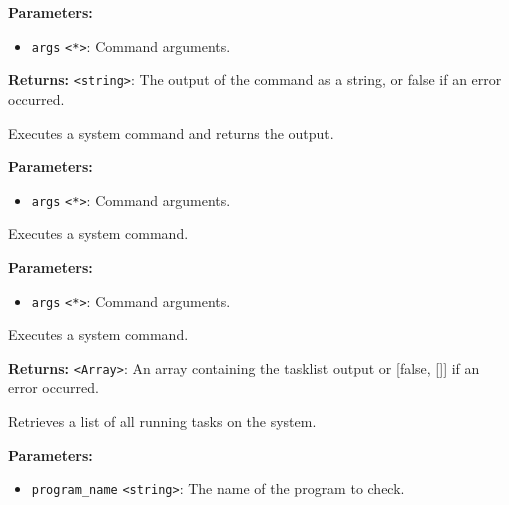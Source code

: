 \documentclass[12pt,a4paper]{article}
\begin{document}
\noindent \textbf{Parameters:}
\begin{itemize}
  \item \texttt{args} \texttt{<*>}: Command arguments.
\end{itemize}

\noindent \textbf{Returns:} \texttt{<string>}: The output of the command as a string, or false if an error occurred.

\noindent Executes a system command and returns the output.

\vspace{5mm}
\noindent {}


\noindent \textbf{Parameters:}
\begin{itemize}
  \item \texttt{args} \texttt{<*>}: Command arguments.
\end{itemize}

\noindent Executes a system command.

\vspace{5mm}
\noindent {}


\noindent \textbf{Parameters:}
\begin{itemize}
  \item \texttt{args} \texttt{<*>}: Command arguments.
\end{itemize}

\noindent Executes a system command.

\vspace{5mm}
\noindent {}


\noindent \textbf{Returns:} \texttt{<Array>}: An array containing the tasklist output or [false, []] if an error occurred.

\noindent Retrieves a list of all running tasks on the system.

\vspace{5mm}
\noindent {}


\noindent \textbf{Parameters:}
\begin{itemize}
  \item \texttt{program\_name} \texttt{<string>}: The name of the program to check.
\end{itemize}
\end{document}
